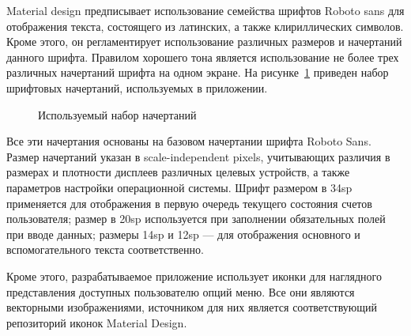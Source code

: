Material design предписывает использование семейства шрифтов
Roboto sans для отображения текста, состоящего из латинских,
а также клириллических символов. Кроме этого, он регламентирует
использование различных размеров и начертаний данного шрифта.
Правилом хорошего тона является использование не более трех
различных начертаний шрифта на одном экране.
На рисунке~\ref{fig:design_fonts} приведен набор
шрифтовых начертаний, используемых в приложении.

\begin{figure}[h!]
  \centering
  \caption{Используемый набор начертаний}
  \label{fig:design_fonts}
\end{figure}

Все эти начертания основаны на базовом начертании шрифта Roboto Sans.
Размер начертаний указан в scale-independent pixels, учитывающих различия
в размерах и плотности дисплеев различных целевых устройств,
а также параметров настройки операционной системы.
Шрифт размером в 34sp применяется для отображения в первую очередь
текущего состояния счетов пользователя;
размер в 20sp используется при заполнении обязательных полей при вводе данных;
размеры 14sp и 12sp --- для отображения основного и вспомогательного текста
соответственно.

Кроме этого, разрабатываемое приложение использует иконки для
наглядного представления доступных пользователю опций меню.
Все они являются векторными изображениями, источником для них
является соответствующий репозиторий иконок Material Design.